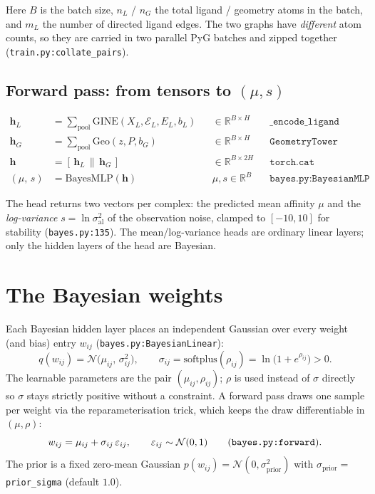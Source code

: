 \documentclass[11pt,a4paper]{article}
\newcommand{\R}{\mathbb{R}}
\newcommand{\N}{\mathcal{N}}
\newcommand{\code}[1]{\texttt{#1}}
\newcommand{\softplus}{\mathrm{softplus}}
\begin{document}
\noindent
Here $B$ is the batch size, $n_L$ / $n_G$ the total ligand / geometry atoms in the
batch, and $m_L$ the number of directed ligand edges. The two graphs have
\emph{different} atom counts, so they are carried in two parallel PyG batches and
zipped together (\code{train.py:collate\_pairs}).

\subsection*{Forward pass: from tensors to $(\mu, s)$}

\begin{align}
\mathbf{h}_L &= \textstyle\sum_{\text{pool}} \mathrm{GINE}(X_L, \mathcal{E}_L, E_L, b_L)
              && \in \R^{B\times H} && \code{\_encode\_ligand} \\
\mathbf{h}_G &= \textstyle\sum_{\text{pool}} \mathrm{Geo}(z, P, b_G)
              && \in \R^{B\times H} && \code{GeometryTower} \\
\mathbf{h}   &= [\,\mathbf{h}_L \,\|\, \mathbf{h}_G\,]
              && \in \R^{B\times 2H} && \code{torch.cat} \\
(\mu,\, s)   &= \mathrm{BayesMLP}(\mathbf{h})
              && \mu,s \in \R^{B} && \code{bayes.py:BayesianMLP}
\end{align}

The head returns two vectors per complex: the predicted mean affinity $\mu$ and the
\emph{log-variance} $s = \ln\sigma_{\text{al}}^2$ of the observation noise, clamped to
$[-10, 10]$ for stability (\code{bayes.py:135}). The mean/log-variance heads are
ordinary linear layers; only the hidden layers of the head are Bayesian.

\section{The Bayesian weights}
\label{sec:weights}

Each Bayesian hidden layer places an independent Gaussian over every weight (and
bias) entry $w_{ij}$ (\code{bayes.py:BayesianLinear}):
\begin{equation}
q(w_{ij}) = \N\!\bigl(\mu_{ij},\, \sigma_{ij}^2\bigr),
\qquad
\sigma_{ij} = \softplus(\rho_{ij}) = \ln\!\bigl(1 + e^{\rho_{ij}}\bigr) > 0 .
\end{equation}
The learnable parameters are the pair $(\mu_{ij}, \rho_{ij})$; $\rho$ is used instead
of $\sigma$ directly so $\sigma$ stays strictly positive without a constraint.
A forward pass draws one sample per weight via the reparameterisation trick, which
keeps the draw differentiable in $(\mu,\rho)$:
\begin{equation}
w_{ij} = \mu_{ij} + \sigma_{ij}\,\varepsilon_{ij},
\qquad \varepsilon_{ij}\sim\N(0,1)
\qquad \text{(\code{bayes.py:forward})}.
\end{equation}
The prior is a fixed zero-mean Gaussian $p(w_{ij}) = \N(0,\sigma_{\text{prior}}^2)$
with $\sigma_{\text{prior}} = $ \code{prior\_sigma} (default $1.0$).
\end{document}
